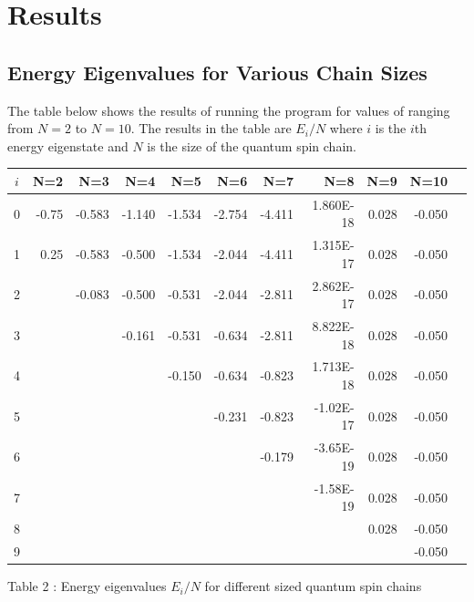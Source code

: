 \documentclass[a4paper]{IEEEtran}
\begin{document}
\section{Results}

    \subsection*{Energy Eigenvalues for Various Chain Sizes} 
    The table below shows the results of running the program for values of ranging
    from $N=2$ to $N=10$. The results in the table are $E_i/N$ where $i$ is the
    $i$th energy eigenstate and $N$ is the size of the quantum spin chain.

    \begin{table}[ht] 
    \begin{center} 
        \begin{tabular}{|c|r|r|r|r|r|r|r|r|r|r|} \hline 
      $i$ & N=2   & N=3    & N=4    & N=5    & N=6    & N=7    & N=8       & N=9   & N=10\\ \hline  \hline
        0 & -0.75 & -0.583 & -1.140 & -1.534 & -2.754 & -4.411 & 1.860E-18 & 0.028 & -0.050 \\ \hline
        1 &  0.25 & -0.583 & -0.500 & -1.534 & -2.044 & -4.411 & 1.315E-17 & 0.028 & -0.050 \\ \hline
        2 &       & -0.083 & -0.500 & -0.531 & -2.044 & -2.811 & 2.862E-17 & 0.028 & -0.050 \\ \hline
        3 &       &        & -0.161 & -0.531 & -0.634 & -2.811 & 8.822E-18 & 0.028 & -0.050 \\ \hline
        4 &       &        &        & -0.150 & -0.634 & -0.823 & 1.713E-18 & 0.028 & -0.050 \\ \hline
        5 &       &        &        &        & -0.231 & -0.823 & -1.02E-17 & 0.028 & -0.050 \\ \hline
        6 &       &        &        &        &        & -0.179 & -3.65E-19 & 0.028 & -0.050 \\ \hline
        7 &       &        &        &        &        &        & -1.58E-19 & 0.028 & -0.050 \\ \hline
        8 &       &        &        &        &        &        &           & 0.028 & -0.050 \\ \hline
        9 &       &        &        &        &        &        &           &       & -0.050 \\ \hline
        \end{tabular}
        \vspace{1mm}
        \begin{center}
        Table 2 : Energy eigenvalues $E_i/N$ for different sized quantum spin chains
        \end{center}
    \end{center}
    \end{table} 
\end{document}
